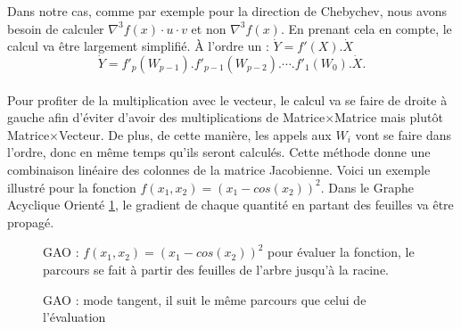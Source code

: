 \label{chap2:tangent}
Dans notre cas, comme par exemple pour la direction de Chebychev, nous avons besoin de calculer $\nabla^3f(x)\cdot u\cdot v$ et non $\nabla^3f(x)$.
 En prenant cela en compte, le calcul va être largement simplifi\'e. \`A l'ordre un : $\dot{Y}=f'(X).\dot{X}$
$$\dot{Y}=f'_p(W_{p-1}) . f'_{p-1}(W_{p-2}) . \cdots .f'_1(W_0).\dot{X}.$$\\
Pour profiter de la multiplication avec le vecteur, le calcul va se faire de droite \`a gauche afin d'\'eviter d'avoir des multiplications de 
Matrice$\times$Matrice mais plut\^ot Matrice$\times$Vecteur. De plus, de cette mani\`ere, les appels aux $W_i$ vont
se faire dans l'ordre, donc en même temps qu'ils seront calcul\'es. Cette m\'ethode donne une combinaison lin\'eaire des 
colonnes de la matrice Jacobienne.
Voici un exemple illustr\'e pour la fonction $f(x_1,x_2)=(x_1-cos(x_2))^2$. Dans le Graphe Acyclique Orient\'e \ref{fig:gao}, le 
gradient de chaque quantit\'e en partant des feuilles va être propag\'e.


\begin{figure}
\caption{GAO : $f(x_1,x_2)=(x_1-cos(x_2))^2$ pour \'evaluer la fonction, le parcours se fait 
\`a partir des feuilles de l'arbre jusqu'\`a la racine.}
\begin{center}
\end{center}
\label{fig:gao}
\end{figure}












\begin{figure}
\caption{GAO : mode tangent, il suit le même parcours que celui de l'\'evaluation}
\begin{center}
\end{center}
\label{fig:modetangent}
\end{figure}



